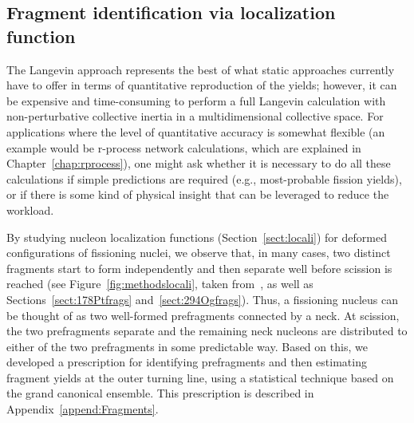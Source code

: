 \subsection{Fragment identification via localization function}\label{sect:FragID}
The Langevin approach represents the best of what static approaches currently have to offer in terms of quantitative reproduction of the yields; however, it can be expensive and time-consuming to perform a full Langevin calculation with non-perturbative collective inertia in a multidimensional collective space. For applications where the level of quantitative accuracy is somewhat flexible (an example would be r-process network calculations, which are explained in Chapter~\ref{chap:rprocess}), one might ask whether it is necessary to do all these calculations if simple predictions are required (e.g., most-probable fission yields), or if there is some kind of physical insight that can be leveraged to reduce the workload.

By studying nucleon localization functions (Section~\ref{sect:locali}) for deformed configurations of fissioning nuclei, we observe that, in many cases, two distinct fragments start to form independently and then separate well before scission is reached (see Figure~\ref{fig:methodslocali}, taken from~\cite{Zhang2016}, as well as Sections~\ref{sect:178Ptfrags} and~\ref{sect:294Ogfrags}). Thus, a fissioning nucleus can be thought of as two well-formed prefragments connected by a neck. At scission, the two prefragments separate and the remaining neck nucleons are distributed to either of the two prefragments in some predictable way. Based on this, we developed a prescription for identifying prefragments and then estimating fragment yields at the outer turning line, using a statistical technique based on the grand canonical ensemble. This prescription is described in Appendix~\ref{append:Fragments}.